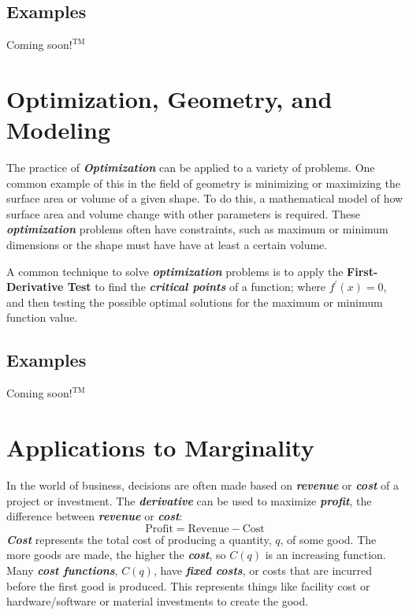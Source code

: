 \begin{center}
\section*{\small Examples}
Coming soon$!^{\text{TM}}$
\end{center}

\section{Optimization, Geometry, and Modeling}
The practice of \textbf{\textit{Optimization}} can be applied to a variety of problems. One common example of this in the field of geometry is minimizing or maximizing the surface area or volume of a given shape. To do this, a mathematical model of how surface area and volume change with other parameters is required. These \textbf{\textit{optimization}} problems often have constraints, such as maximum or minimum dimensions or the shape must have have at least a certain volume.

\vspace{0.1in}
A common technique to solve \textbf{\textit{optimization}} problems is to apply the \textbf{First-Derivative Test} to find the \textbf{\textit{critical points}} of a function; where $f^\prime(x) = 0$, and then testing the possible optimal solutions for the maximum or minimum function value.

\begin{center}
\section*{\small Examples}
Coming soon$!^{\text{TM}}$
\end{center}

\section{Applications to Marginality}
In the world of business, decisions are often made based on \textbf{\textit{revenue}} or \textbf{\textit{cost}} of a project or investment. The \textbf{\textit{derivative}} can be used to maximize \textbf{\textit{profit}}, the difference between \textbf{\textit{revenue}} or \textbf{\textit{cost}}:
%
\begin{equation}
\text{Profit} = \text{Revenue} - \text{Cost}
\end{equation}
%
\textbf{\textit{Cost}} represents the total cost of producing a quantity, $q$, of some good. The more goods are made, the higher the \textbf{\textit{cost}}, so $C(q)$ is an increasing function. Many \textbf{\textit{cost functions}}, $C(q)$, have \textbf{\textit{fixed costs}}, or costs that are incurred before the first good is produced. This represents things like facility cost or hardware/software or material investments to create the good.

